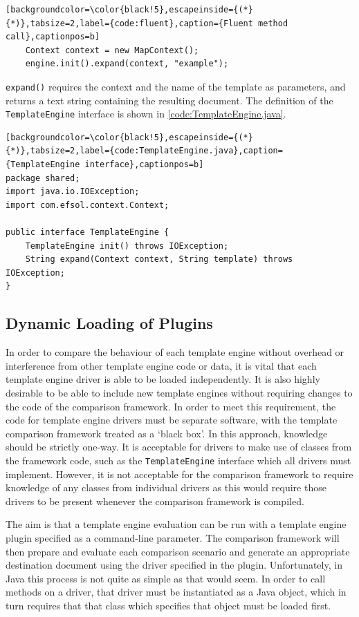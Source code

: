 \begin{lstlisting}[backgroundcolor=\color{black!5},escapeinside={(*}{*)},tabsize=2,label={code:fluent},caption={Fluent method call},captionpos=b]
    Context context = new MapContext();
    engine.init().expand(context, "example");
\end{lstlisting}

\verb!expand()! requires the context and the name of the template as parameters, and returns a text string containing the resulting document. The definition of the \verb!TemplateEngine! interface is shown in \autoref{code:TemplateEngine.java}.

\begin{lstlisting}[backgroundcolor=\color{black!5},escapeinside={(*}{*)},tabsize=2,label={code:TemplateEngine.java},caption={TemplateEngine interface},captionpos=b]
package shared;
import java.io.IOException;
import com.efsol.context.Context;

public interface TemplateEngine {
    TemplateEngine init() throws IOException;
    String expand(Context context, String template) throws IOException;
}\end{lstlisting}

\subsection{Dynamic Loading of Plugins}
\label{comp:plugins:dynamic}

In order to compare the behaviour of each template engine without overhead or interference from other template engine code or data, it is vital that each template engine driver is able to be loaded independently. It is also highly desirable to be able to include new template engines without requiring changes to the code of the comparison framework. In order to meet this requirement, the code for template engine drivers must be separate software, with the template comparison framework treated as a `black box'. In this approach, knowledge should be strictly one-way. It is acceptable for drivers to make use of classes from the framework code, such as the \verb!TemplateEngine! interface which all drivers must implement. However, it is not acceptable for the comparison framework to require knowledge of any classes from individual drivers as this would require those drivers to be present whenever the comparison framework is compiled.

The aim is that a template engine evaluation can be run with a template engine plugin specified as a command-line parameter. The comparison framework will then prepare and evaluate each comparison scenario and generate an appropriate destination document using the driver specified in the plugin. Unfortunately, in Java this process is not quite as simple as that would seem. In order to call methods on a driver, that driver must be instantiated as a Java object, which in turn requires that that class which specifies that object must be loaded first.

